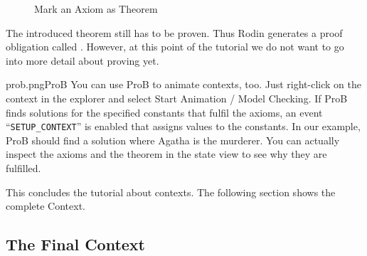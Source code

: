 \begin{figure}[h!t]
\begin{center}
	\caption{Mark an Axiom as Theorem}
	\label{fig_tut_05_mark_theorem}
\end{center}
\end{figure}


The introduced theorem still has to be proven.
Thus Rodin generates a proof obligation called .
However, at this point of the tutorial we do not want to go into more detail about proving yet.

\begin{rodin-plugin}{prob.png}{ProB}%
  You can use ProB to animate contexts, too. Just right-click on the context in the explorer and select \textsf{Start Animation / Model Checking}. If ProB finds solutions for the specified constants that fulfil the axioms, an event ``\texttt{SETUP\_CONTEXT}'' is enabled that assigns values to the constants. In our example, ProB should find a solution where Agatha is the murderer. You can actually inspect the axioms and the theorem in the state view to see why they are fulfilled.
\end{rodin-plugin}

This concludes the tutorial about contexts. The following section shows the complete Context.

\subsection{The Final Context} 
\label{tut_final_context}

